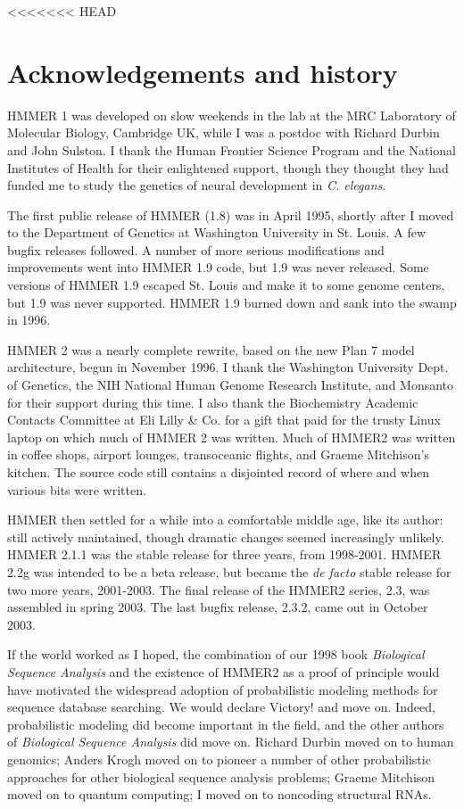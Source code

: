 <<<<<<< HEAD
\chapter{Acknowledgements and history}

HMMER 1 was developed on slow weekends in the lab at the MRC
Laboratory of Molecular Biology, Cambridge UK, while I was a postdoc
with Richard Durbin and John Sulston. I thank the Human Frontier
Science Program and the National Institutes of Health for their
enlightened support, though they thought they had funded me to study
the genetics of neural development in \emph{C. elegans}.

The first public release of HMMER (1.8) was in April 1995, shortly
after I moved to the Department of Genetics at Washington University
in St. Louis. A few bugfix releases followed. A number of more serious
modifications and improvements went into HMMER 1.9 code, but 1.9 was
never released. Some versions of HMMER 1.9 escaped St. Louis and make
it to some genome centers, but 1.9 was never supported. HMMER 1.9
burned down and sank into the swamp in 1996.

HMMER 2 was a nearly complete rewrite, based on the new Plan 7 model
architecture, begun in November 1996. I thank the Washington
University Dept. of Genetics, the NIH National Human Genome Research
Institute, and Monsanto for their support during this time.  I also
thank the Biochemistry Academic Contacts Committee at Eli Lilly \&
Co. for a gift that paid for the trusty Linux laptop on which much of
HMMER 2 was written. Much of HMMER2 was written in coffee shops,
airport lounges, transoceanic flights, and Graeme Mitchison's
kitchen. The source code still contains a disjointed record of where
and when various bits were written.

HMMER then settled for a while into a comfortable middle age, like its
author: still actively maintained, though dramatic changes seemed
increasingly unlikely. HMMER 2.1.1 was the stable release for three
years, from 1998-2001.  HMMER 2.2g was intended to be a beta release,
but became the \emph{de facto} stable release for two more years,
2001-2003. The final release of the HMMER2 series, 2.3, was assembled
in spring 2003.  The last bugfix release, 2.3.2, came out in October
2003.

If the world worked as I hoped, the combination of our 1998 book
\emph{Biological Sequence Analysis} and the existence of HMMER2 as a
proof of principle would have motivated the widespread adoption of
probabilistic modeling methods for sequence database searching. We
would declare Victory! and move on. Indeed, probabilistic modeling did
become important in the field, and the other authors of
\emph{Biological Sequence Analysis} did move on.  Richard Durbin moved
on to human genomics; Anders Krogh moved on to pioneer a number of
other probabilistic approaches for other biological sequence analysis
problems; Graeme Mitchison moved on to quantum computing; I moved on
to noncoding structural RNAs.

